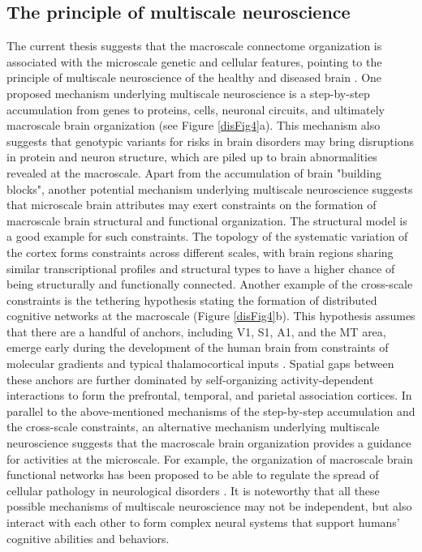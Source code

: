 \begin{refsection}
\subsection*{The principle of multiscale neuroscience}
The current thesis suggests that the macroscale connectome organization is associated with the microscale genetic and cellular features, pointing to the principle of multiscale neuroscience of the healthy and diseased brain \citep{Heuvel2019MultiscaleNO}. One proposed mechanism underlying multiscale neuroscience is a step-by-step accumulation from genes to proteins, cells, neuronal circuits, and ultimately macroscale brain organization (see Figure \ref{disFig4}a). This mechanism also suggests that genotypic variants for risks in brain disorders may bring disruptions in protein and neuron structure, which are piled up to brain abnormalities revealed at the macroscale. Apart from the accumulation of brain "building blocks", another potential mechanism underlying multiscale neuroscience suggests that microscale brain attributes may exert constraints on the formation of macroscale brain structural and functional organization. The structural model \citep{GarcaCabezas2019TheSM} is a good example for such constraints. The topology of the systematic variation of the cortex forms constraints across different scales, with brain regions sharing similar transcriptional profiles and structural types to have a higher chance of being structurally and functionally connected. Another example of the cross-scale constraints is the tethering hypothesis stating the formation of distributed cognitive networks at the macroscale \citep{buckner2013evolution} (Figure \ref{disFig4}b). This hypothesis assumes that there are a handful of anchors, including V1, S1, A1, and the MT area, emerge early during the development of the human brain from constraints of molecular gradients \citep{Rakic2009EvolutionOT} and typical thalamocortical inputs \citep{OLeary2008GeneticRO}. Spatial gaps between these anchors are further dominated by self-organizing activity-dependent interactions to form the prefrontal, temporal, and parietal association cortices. In parallel to the above-mentioned mechanisms of the step-by-step accumulation and the cross-scale constraints, an alternative mechanism underlying multiscale neuroscience suggests that the macroscale brain organization provides a guidance for activities at the microscale. For example, the organization of macroscale brain functional networks has been proposed to be able to regulate the spread of cellular pathology in neurological disorders \citep{Buckner2009CorticalHR,Seeley2009NeurodegenerativeDT,Zhou2012PredictingRN}. It is noteworthy that all these possible mechanisms of multiscale neuroscience may not be independent, but also interact with each other to form complex neural systems that support humans’ cognitive abilities and behaviors. 



\end{refsection}
